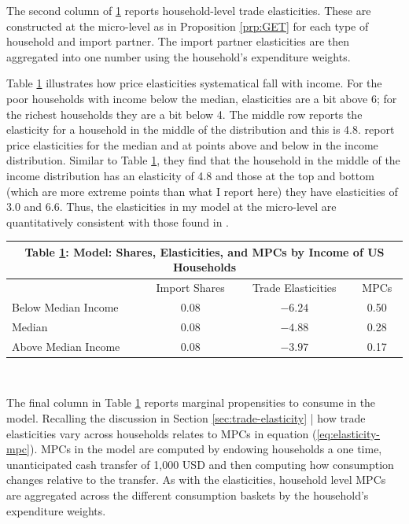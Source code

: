 \documentclass[12pt,pdftex]{article}
\renewcommand{\arraystretch}{1.1}
\begin{document}
\begin{onehalfspacing}
The second column of \ref{tb-micro-shares} reports household-level trade elasticities. These are constructed at the micro-level as in Proposition \ref{prp:GET} for each type of household and import partner. The import partner elasticities are then aggregated into one number using the household's expenditure weights.

Table \ref{tb-micro-shares} illustrates how price elasticities systematical fall with income. For the poor households with income below the median, elasticities are a bit above 6; for the richest households they are a bit below 4. The middle row reports the elasticity for a household in the middle of the distribution and this is 4.8.  \citet{auer2022unequal} report price elasticities for the median and at points above and below in the income distribution. Similar to Table  \ref{tb-micro-shares}, they find that the household in the middle of the income distribution has an elasticity of 4.8 and those at the top and bottom (which are more extreme points than what I report here) they have elasticities of 3.0 and 6.6. Thus, the elasticities in my model at the micro-level are quantitatively consistent with those found in \citet{auer2022unequal}.

\begin{table}[t]
\small
\begin{center}
\setlength {\tabcolsep}{5.5mm}
\renewcommand{\arraystretch}{1.60}\label{tb-micro-shares}
\begin{tabular}[t]{l c c c}
\multicolumn{4}{c}{{\normalsize\textbf{Table \ref{tb-micro-shares}: Model: Shares, Elasticities, and MPCs by Income of US Households}} }
\\\hline \hline
& Import Shares & Trade Elasticities & MPCs\\
\cmidrule(lr){2-2} \cmidrule(lr){3-3} \cmidrule(lr){4-4}
Below Median Income & $0.08$ & $-6.24$ & 0.50\\
Median   & $0.08$ & $-4.88$ & 0.28\\
Above Median Income & $0.08$ & $-3.97$ & 0.17\\
\hline
\end{tabular}
\\[0.5ex]
\end{center}
\end{table}

The final column in Table \ref{tb-micro-shares} reports marginal propensities to consume in the model. Recalling the discussion in Section \ref{sec:trade-elasticity} | how trade elasticities vary across households relates to MPCs in equation (\ref{eq:elasticity-mpc}).  MPCs in the model are computed by endowing households a one time, unanticipated cash transfer of 1,000 USD and then computing how consumption changes relative to the transfer. As with the elasticities, household level MPCs are aggregated across the different consumption baskets by the household's expenditure weights.


\end{onehalfspacing}
\end{document}

